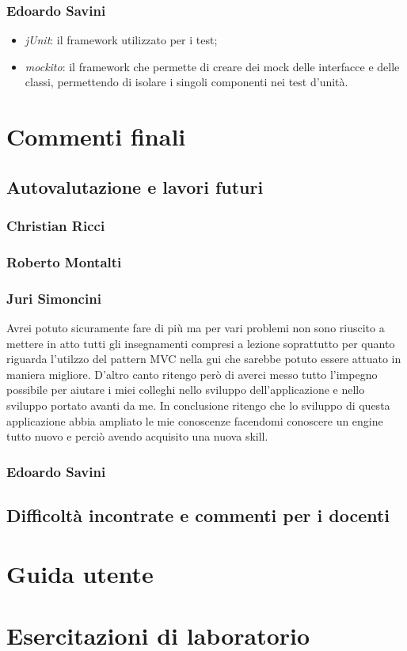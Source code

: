 \subsection{Edoardo Savini}

\begin{itemize}
    \item \emph{jUnit}: il framework utilizzato per i test;
    
    \item \emph{mockito}: il framework che permette di creare dei mock delle interfacce e delle classi, permettendo di isolare i singoli componenti nei test d'unità.
\end{itemize}

\chapter{Commenti finali}

\section{Autovalutazione e lavori futuri}
\subsection{Christian Ricci}

\subsection{Roberto Montalti}

\subsection{Juri Simoncini}
Avrei potuto sicuramente fare di più ma per vari problemi non sono riuscito a mettere in atto tutti gli insegnamenti compresi a lezione soprattutto per quanto riguarda l'utilzzo del pattern MVC nella gui che sarebbe potuto essere attuato in maniera migliore.
D'altro canto ritengo però di averci messo tutto l'impegno possibile per aiutare i miei colleghi nello sviluppo dell'applicazione e nello sviluppo portato avanti da me.
In conclusione ritengo che lo sviluppo di questa applicazione abbia ampliato le mie conoscenze facendomi conoscere un engine tutto nuovo e perciò avendo acquisito una nuova skill. 

\subsection{Edoardo Savini}



\section{Difficoltà incontrate e commenti per i docenti}


\appendix
\chapter{Guida utente}

\chapter{Esercitazioni di laboratorio}






